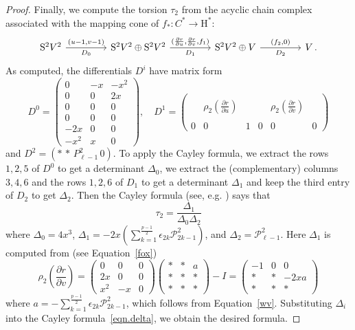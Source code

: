 \documentclass{amsart}
\renewcommand{\S}{\mathrm{S}}
\def\calP{\mathcal{P}}
\theoremstyle{definition}
\begin{document}
\begin{proof}
Finally, we compute the torsion $\tau_2$ from the acyclic chain complex associated with the mapping cone of $f_\ast : C^\ast \rightarrow \mathrm{H}^\ast$:
\begin{equation*}
    \begin{tikzcd}[column sep=1.5cm]
        \S^2 V^2  \ar[r,"{(u-1,v-1)}","D_0"'] & \S^2V^2 \oplus \S^2V^2 \ar[r,"{(\frac{\partial r}{\partial u}, \frac{\partial r}{\partial v},f_1)}","D_1"'] & \S^2V^2 \oplus V \ar[r,"{(f_2,0)}","D_2"'] & V \,.
    \end{tikzcd}
\end{equation*}
As computed, the differentials $D^i$ have matrix form
$$D^0=\left(\begin{array}{ccc}0 &-x &-x^2\\ 0& 0 &2x\\ 0 & 0 & 0 \\ \hline 0 & 0 &0\\ -2x & 0 & 0 \\ -x^2 & x & 0\end{array}\right),\quad D^1=\left(\begin{array}{ccc|ccc}&&&&&\\&\rho_2(\frac{\partial r}{\partial u})&&& \rho_2(\frac{\partial r}{\partial v})&\\&&&&& \\\hline 0&0&1&0&0&0 \end{array}\right)$$
and $D^2=\left(*\,*\,P_{\ell-1}^2\, 0\right)$.
To apply the Cayley formula, we extract the rows $1,2,5$ of $D^0$ to get a determinant $\Delta_0$, we extract the (complementary) columns $3,4,6$ and the rows $1,2,6$ of $D_1$ to get a determinant $\Delta_1$ and keep the third entry of $D_2$ to get $\Delta_2$. Then the Cayley formula (see, e.g. \cite[p.485]{GKZ}) says that
\begin{equation}
\label{eqn.delta}
\tau_2 = \frac{\Delta_1}{\Delta_0 \Delta_2}
\end{equation}
where $\Delta_0 = 4x^3$, $\Delta_1 = -2x(\sum_{k=1}^{\frac{p-1}{2}} \epsilon_{2k}\calP_{2k-1}^2) $, and $\Delta_2 = \calP_{\ell-1}^2$. Here $\Delta_1$ is computed from (see Equation~\eqref{fox})
$$
\rho_2 \left( \frac{\partial r}{\partial v} \right) = \begin{pmatrix}
    0 & 0 & 0 \\
    2x & 0 & 0 \\
    x^2 & -x & 0
\end{pmatrix}
\begin{pmatrix}
    \ast & \ast & a \\
    \ast & \ast & \ast \\
    \ast & \ast & \ast
\end{pmatrix} - I = \begin{pmatrix}
    -1 & 0 & 0 \\
    \ast & \ast & -2xa \\
    \ast & \ast & \ast
\end{pmatrix}
$$
where $a=-\sum_{k=1}^{\frac{p-1}{2}} \epsilon_{2k}\calP_{2k-1}^2$, which follows from Equation~\eqref{wv}. Substituting $\Delta_i$  into the Cayley formula~\eqref{eqn.delta}, we obtain the desired formula.


\end{proof}
\end{document}
